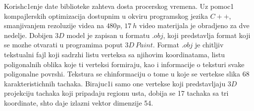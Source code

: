\documentclass[a4paper, openany, oneside, 11pt]{book}
\begin{document}
Korish\-c1enje date biblioteke zahteva dosta procerskog vremena. Uz pomoc1 kompajlerskih optimizacija dostupnim u okviru programskog jezika $C++$, smanjivanjem rezoluzije videa na $480p$, $\SI{17}{h}$ video materijala je obradjeno za dve nedelje. Dobijen $3D$ model je zapisan u formatu $.obj$, koji predstavlja format koji se mozhe otvarati u programima poput $3D\ Paint$. Format $.obj$ je chitljiv tekstualni fajl \cite{obj} koji sadrzhi listu verteksa sa njihovim koordinatama, listu poligonalnih oblika koje ti verteksi formiraju, kao i informacije o teksturi svake poligonalne povrshi. Tekstura se chinformaciju o tome u koje se vertekse slika 68 karakteristichnih tachaka. Birajuc1i samo one vertekse koji predstavljaju $3D$ projekciju tachaka koji pripadaju regionu usta, dobija se 17 tachaka sa tri koordinate, shto daje izlazni vektor dimenzije 54.
\begin{table}[!h]
	\begin{center}
	\end{center}
\caption{Mapiranje karakteristichnih tachaka usta na $3D$ model}
\label{tab:3_1}
\end{table}
\end{document}
